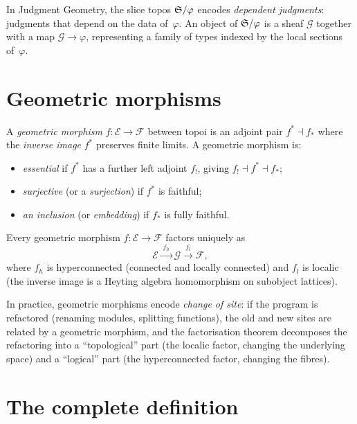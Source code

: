 In Judgment Geometry, the slice topos $\mathfrak{S}/\varphi$ encodes
\emph{dependent judgments}: judgments that depend on the data
of~$\varphi$.  An object of $\mathfrak{S}/\varphi$ is a sheaf $\mathcal{G}$
together with a map $\mathcal{G} \to \varphi$, representing a family of
types indexed by the local sections of~$\varphi$.

\section{Geometric morphisms}
\label{sec:geom-morph}

\begin{definition}
\label{def:geom-morph}
A \emph{geometric morphism} $f : \mathcal{E} \to \mathcal{F}$ between
topoi is an adjoint pair $f^* \dashv f_*$ where the \emph{inverse
image} $f^*$ preserves finite limits.  A geometric morphism is:
\begin{itemize}[nosep]
\item \emph{essential} if $f^*$ has a further left adjoint $f_!$,
  giving $f_! \dashv f^* \dashv f_*$;
\item \emph{surjective} (or a \emph{surjection}) if $f^*$ is faithful;
\item \emph{an inclusion} (or \emph{embedding}) if $f_*$ is fully
  faithful.
\end{itemize}
\end{definition}

\begin{theorem}
\label{thm:factorisation}
Every geometric morphism $f : \mathcal{E} \to \mathcal{F}$ factors
uniquely as
\[
  \mathcal{E} \xrightarrow{\;f_h\;} \mathcal{G}
  \xrightarrow{\;f_l\;} \mathcal{F},
\]
where $f_h$ is hyperconnected (connected and locally connected) and
$f_l$ is localic (the inverse image is a Heyting algebra homomorphism
on subobject lattices).
\end{theorem}

In practice, geometric morphisms encode \emph{change of site}: if the
program is refactored (renaming modules, splitting functions), the
old and new sites are related by a geometric morphism, and the
factorisation theorem decomposes the refactoring into a ``topological''
part (the localic factor, changing the underlying space) and a
``logical'' part (the hyperconnected factor, changing the fibres).

\section{The complete definition}

